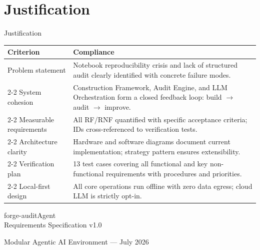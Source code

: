 \documentclass[aspectratio=169,11pt]{beamer}
\begin{document}
\section{Justification}

\begin{frame}[shrink]{Justification}
  \centering
  \footnotesize
  \renewcommand{\arraystretch}{0.85}
  \begin{tabularx}{\textwidth}{l X}
    \toprule
    \textbf{Criterion} & \textbf{Compliance} \\
    \midrule
    Problem statement & Notebook reproducibility crisis and lack of structured audit clearly identified with concrete failure modes. \\
    \cmidrule{2-2}
    System cohesion & Construction Framework, Audit Engine, and LLM Orchestration form a closed feedback loop: build $\rightarrow$ audit $\rightarrow$ improve. \\
    \cmidrule{2-2}
    Measurable requirements & All RF/RNF quantified with specific acceptance criteria; IDs cross-referenced to verification tests. \\
    \cmidrule{2-2}
    Architecture clarity & Hardware and software diagrams document current implementation; strategy pattern ensures extensibility. \\
    \cmidrule{2-2}
    Verification plan & 13 test cases covering all functional and key non-functional requirements with procedures and priorities. \\
    \cmidrule{2-2}
    Local-first design & All core operations run offline with zero data egress; cloud LLM is strictly opt-in. \\
    \bottomrule
  \end{tabularx}
\end{frame}

\begin{frame}[standout]
  \centering
  \LARGE forge-auditAgent\\[0.1em]
  \normalsize Requirements Specification v1.0

  \vspace{0.5em}
  \small Modular Agentic AI Environment --- July 2026
\end{frame}
\end{document}
